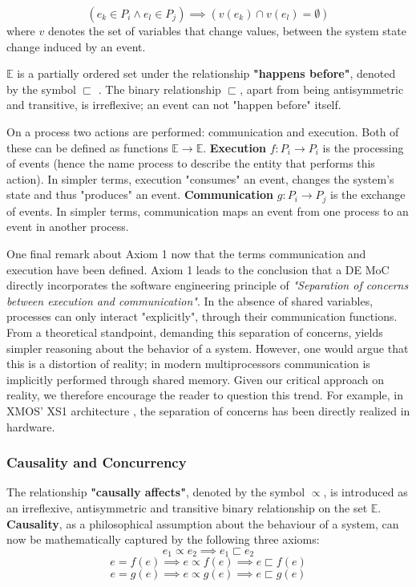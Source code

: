 \documentclass[11pt]{article}
\begin{document}
\begin{equation}
\tag{Axiom 1}
(e_k \in P_i \land e_l \in P_j) \implies (v(e_k) \cap v(e_l) = \emptyset)
\end{equation}
where \(v\) denotes the set of variables that change values, between the system state change induced by an event.

\(\mathds{E}\) is a partially ordered set under the relationship \textbf{"happens before"}, denoted by the symbol \(\sqsubset\) \cite{Lamport1978}.
The binary relationship \(\sqsubset\), apart from being antisymmetric and transitive, is irreflexive; 
an event can not "happen before" itself.

On a process two actions are performed: communication and execution.
Both of these can be defined as functions \(\mathds{E} \rightarrow \mathds{E}\).
\textbf{Execution} \(f: P_i \rightarrow P_i\) is the processing of events (hence the name process to describe the entity that performs this action).
In simpler terms, execution "consumes" an event, changes the system's state and thus "produces" an event.
\textbf{Communication} \(g: P_i \rightarrow P_j\) is the exchange of events.
In simpler terms, communication maps an event from one process to an event in another process.

One final remark about Axiom 1 now that the terms communication and execution have been defined.
Axiom 1 leads to the conclusion that a DE MoC directly incorporates the software engineering principle of \textit{"Separation of concerns between execution and communication"}.
In the absence of shared variables, processes can only interact "explicitly", through their communication functions.
From a theoretical standpoint, demanding this separation of concerns, yields simpler reasoning about the behavior of a system.
However, one would argue that this is a distortion of reality; in modern multiprocessors communication is implicitly performed through shared memory.
Given our critical approach on reality, we therefore encourage the reader to question this trend.
For example, in XMOS' XS1 architecture \cite{May2009}, the separation of concerns has been directly realized in hardware.

\subsubsection{Causality and Concurrency}
\label{sec:org24034ff}
The relationship \textbf{"causally affects"}, denoted by the symbol \(\propto\), is introduced as an irreflexive, antisymmetric and transitive binary relationship on the set \(\mathds{E}\).
\textbf{Causality}, as a philosophical assumption about the behaviour of a system, can now be mathematically captured by the following three axioms:
\begin{equation}
\tag{Axiom 2}
e_1 \propto e_2 \implies e_1 \sqsubset e_2
\end{equation}
\begin{equation}
\tag{Axiom 3}
e = f(e) \implies e \propto f(e) \implies e \sqsubset f(e) 
\end{equation}
\begin{equation}
\tag{Axiom 4}
e = g(e) \implies e \propto g(e) \implies e \sqsubset g(e)
\end{equation}
\end{document}
